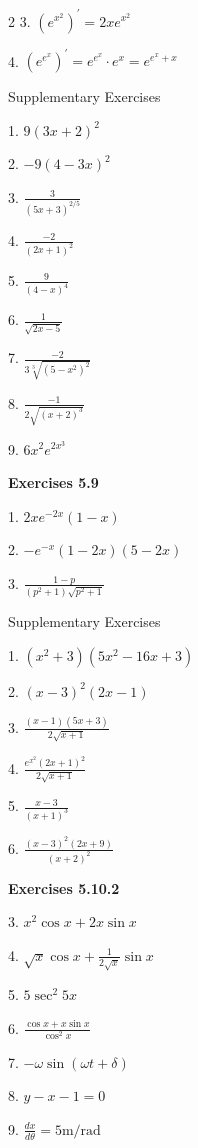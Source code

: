\begin {multicols}{2}
3. $\left (e^{x^{2}}\right )^{ \prime } =2 x e^{x^{2}}$ 

4. $\left (e^{e^{x}}\right )^{ \prime } =e^{e^{x}} \cdot e^{x} =e^{e^{x} +x}$ 

Supplementary Exercises 

1. $9 \left (3 x +2\right )^{2}$ 

2. $ -9 \left (4 -3 x\right )^{2}$ 

3. $\frac{3}{\left (5 x +3\right )^{2/5}}$ 

4. $\frac{ -2}{\left (2 x +1\right )^{2}}$ 

5. $\frac{9}{\left (4 -x\right )^{4}}$ 

6. $\frac{1}{\sqrt{2 x -5}}$ 

7. $\frac{ -2}{3 \sqrt[{3}]{\left (5 -x^{2}\right )^{2}}}$ 

8. $\frac{ -1}{2 \sqrt{\left (x +2\right )^{3}}}$ 

9. $6 x^{2} e^{2 x^{3}}$ 

\textbf{Exercises 5.9} 

1. $2 x e^{ -2 x} \left (1 -x\right )$ 

2. $ -e^{ -x} (1 -2 x) \left (5 -2 x\right )$ 

3. $\frac{1 -p}{\left (p^{2} +1\right ) \sqrt{p^{2} +1}}$ 

Supplementary Exercises 

1. $\left (x^{2} +3\right ) \left (5 x^{2} -16 x +3\right )$ 

2. $\left (x -3\right )^{2} \left (2 x -1\right )$ 

3. $\frac{\left (x -1\right ) \left (5 x +3\right )}{2 \sqrt{x +1}}$ 

4. $\frac{e^{x^{2}} \left (2 x +1\right )^{2}}{2 \sqrt{x +1}}$ 

5. $\frac{x -3}{\left (x +1\right )^{3}}$ 

6. $\frac{\left (x -3\right )^{2} \left (2 x +9\right )}{\left (x +2\right )^{2}}$ 

\textbf{Exercises 5.10.2} 

3. $x^{2} \cos  x +2 x \sin  x$ 

4. $\sqrt{x} \cos  x +\frac{1}{2 \sqrt{x}} \sin  x$ 

5. $5 \sec ^{2} 5 x$ 

6. $\frac{\cos  x +x \sin  x}{\cos ^{2} x}$ 

7. $ -\omega  \sin  \left (\omega  t +\delta \right )$ 

8. $y -x -1 =0$ 

9. $\frac{d x}{d \theta } =5 \mathrm{m}/\mbox{rad}$ 


\end{multicols}

